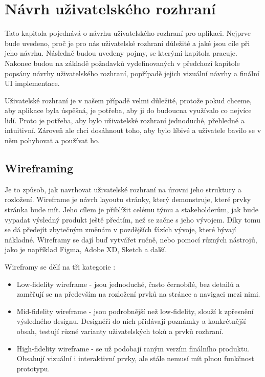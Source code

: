 \chapter{Návrh uživatelského rozhraní}
\begin{chapterabstract}
    Tato kapitola pojednává o návrhu uživatelského rozhraní pro aplikaci. Nejprve bude uvedeno, proč je pro nás uživatelské rozhraní důležité a jaké jsou cíle při jeho návrhu. Následně budou uvedeny pojmy, se kterými kapitola pracuje. Nakonec budou na základě požadavků vydefinovaných v předchozí kapitole popsány návrhy uživatelského rozhraní, popřípadě jejich vizuální návrhy a finální UI implementace.
\end{chapterabstract}

Uživatelské rozhraní je v našem případě velmi důležité, protože pokud chceme, aby aplikace byla úspěšná, je potřeba, aby ji do budoucna využívalo co nejvíce lidí. Proto je potřeba, aby bylo uživatelské rozhraní jednoduché, přehledné a intuitivní. Zároveň ale chci dosáhnout toho, aby bylo líbivé a uživatele bavilo se v něm pohybovat a používat ho.

\section{Wireframing}
Je to způsob, jak navrhovat uživatelské rozhraní na úrovni jeho struktury a rozložení. Wireframe je návrh layoutu stránky, který demonstruje, které prvky stránka bude mít. Jeho cílem je přiblížit celému týmu a stakeholderům, jak bude vypadat výsledný produkt ještě předtím, než se začne s jeho vývojem. Díky tomu se dá předejít zbytečným změnám v pozdějších fázích vývoje, které bývají nákladné. Wireframy se dají buď vytvářet ručně, nebo pomocí různých nástrojů, jako je například Figma, Adobe XD, Sketch a další. \cite{wireframing:definition}

Wireframy se dělí na tři kategorie \cite{wireframing:types}:
\begin{itemize}
    \item Low-fidelity wireframe - jsou jednoduché, často černobílé, bez detailů a zaměřují se na především na rozložení prvků na stránce a navigaci mezi nimi. 
    \item Mid-fidelity wireframe - jsou podrobnější než low-fidelity, slouží k zpřesnění výsledného designu. Designéři do nich přidávají poznámky a konkrétnější obsah, testují různé varianty uživatelských toků a prvků rozhraní.
    \item High-fidelity wireframe - se už podobají raným verzím finálního produktu. Obsahují vizuální i interaktivní prvky, ale stále nemusí mít plnou funkčnost prototypu.
\end{itemize}

